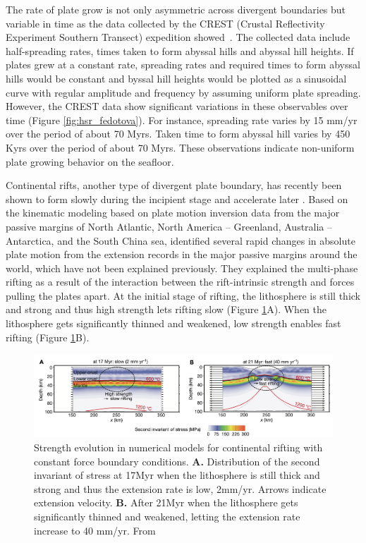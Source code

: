 \documentclass[letterpaper,12pt,notitle]{memphisthesis}                     %
\begin{document}
The rate of plate grow is not only asymmetric across divergent boundaries but variable in time as the data collected by the CREST (Crustal Reflectivity Experiment Southern Transect) expedition showed~\citep{Fedotova2017}. The collected data include half-spreading rates, times taken to form abyssal hills and abyssal hill heights. If plates grew at a constant rate, spreading rates and required times to form abyssal hills would be constant and byssal hill heights would be plotted as a sinusoidal curve with regular amplitude and frequency by assuming uniform plate spreading. However, the CREST data show significant variations in these observables over time (Figure \ref{fig:hsr_fedotova}). For instance, spreading rate varies by 15 mm/yr over the period of about 70 Myrs. Taken time to form abyssal hill varies by 450 Kyrs over the period of about 70 Myrs. These observations indicate non-uniform plate growing behavior on the seafloor.

Continental rifts, another type of divergent plate boundary, has recently been shown to form slowly during the incipient stage and accelerate later \citep{Brune2016}. Based on the kinematic modeling based on plate motion inversion data from the major passive margins of North Atlantic, North America – Greenland, Australia – Antarctica, and the South China sea, \citet{Brune2016} identified several rapid changes in absolute plate motion from the extension records in the major passive margins around the world, which have not been explained previously. They explained the multi-phase rifting as a result of the interaction between the rift-intrinsic strength and forces pulling the plates apart. At the initial stage of rifting, the lithosphere is still thick and strong and thus high strength lets rifting slow (Figure \ref{fig:brune}A). When the lithosphere gets significantly thinned and weakened, low strength enables fast rifting (Figure \ref{fig:brune}B).
%
\begin{figure}[!htb]
	\centering
	\includegraphics[width=0.99\linewidth]{./figs/brune.png}
	\caption{Strength evolution in numerical models for continental rifting with constant force boundary conditions. \textbf{A.} Distribution of the second invariant of stress at 17Myr when the lithosphere is still thick and strong and thus the extension rate is low, 2mm/yr. Arrows indicate extension velocity. \textbf{B.} After 21Myr when the lithosphere gets significantly thinned and weakened, letting the extension rate increase to 40 mm/yr. From \citet{Brune2016}}
	\label{fig:brune}
\end{figure}
\end{document}

